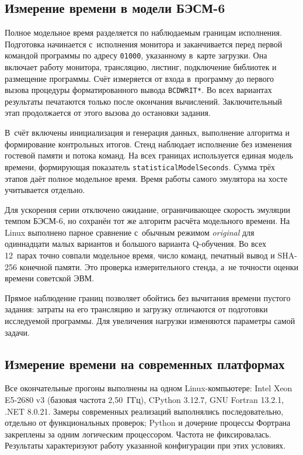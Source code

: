 \documentclass[a4paper,12pt]{article}
\begin{document}
\subsection{Измерение времени в модели БЭСМ-6}

Полное модельное время разделяется по наблюдаемым границам исполнения. Подготовка начинается с~исполнения монитора и заканчивается перед первой командой программы по адресу \texttt{01000}, указанному в~карте загрузки. Она включает работу монитора, трансляцию, листинг, подключение библиотек и размещение программы. Счёт измеряется от входа в~программу до первого вызова процедуры форматированного вывода \texttt{BCDWRIT*}. Во всех вариантах результаты печатаются только после окончания вычислений. Заключительный этап продолжается от этого вызова до остановки задания.

В~счёт включены инициализация и генерация данных, выполнение алгоритма и формирование контрольных итогов. Стенд наблюдает исполнение без изменения гостевой памяти и потока команд. На всех границах используется единая модель времени, формирующая показатель \texttt{statisticalModelSeconds}. Сумма трёх этапов даёт полное модельное время. Время работы самого эмулятора на хосте учитывается отдельно.

Для ускорения серии отключено ожидание, ограничивающее скорость эмуляции темпом БЭСМ-6, но сохранён тот же алгоритм расчёта модельного времени. На Linux выполнено парное сравнение с~обычным режимом \textit{original} для одиннадцати малых вариантов и большого варианта Q-обучения. Во всех 12~парах точно совпали модельное время, число команд, печатный вывод и SHA-256 конечной памяти. Это проверка измерительного стенда, а~не точности оценки времени советской ЭВМ.

Прямое наблюдение границ позволяет обойтись без вычитания времени пустого задания: затраты на его трансляцию и загрузку отличаются от подготовки исследуемой программы. Для увеличения нагрузки изменяются параметры самой задачи.

\subsection{Измерение времени на современных платформах}

Все окончательные прогоны выполнены на одном Linux-компьютере: Intel Xeon E5-2680 v3 (базовая частота 2,50~ГГц), CPython 3.12.7, GNU Fortran 13.2.1, .NET 8.0.21. Замеры современных реализаций выполнялись последовательно, отдельно от функциональных проверок; Python и дочерние процессы Фортрана закреплены за одним логическим процессором. Частота не фиксировалась. Результаты характеризуют работу указанной конфигурации при этих условиях.
\end{document}

